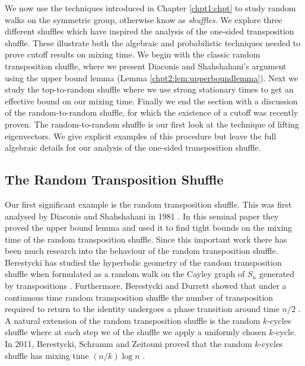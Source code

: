\documentclass[11pt]{report}
\begin{document}
We now use the techniques introduced in Chapter \ref{chpt1:chpt} to study random walks on the symmetric group, otherwise know as \emph{shuffles}. 
We explore three different shuffles which have inspired the analysis of the one-sided transposition shuffle. These illustrate both the algebraic and probabilistic techniques needed to prove cutoff results on mixing time. We begin with the classic random transposition shuffle, where we present Diaconis and Shahshahani's argument using the upper bound lemma (Lemma \ref{chpt2:lem:upperboundlemma}). 
Next we study the top-to-random shuffle where we use strong stationary times to get an effective bound on our mixing time. 
Finally we end the section with a discussion of the random-to-random shuffle, for which the existence of a cutoff was recently proven. The random-to-random shuffle is our first look at the technique of lifting eigenvectors. We give explicit examples of this procedure but leave the full algebraic details for our analysis of the one-sided transposition shuffle.

\subsection{The Random Transposition Shuffle}
\label{chpt4:subsec:rt}

Our first significant example is the random transposition shuffle. This 
was first analysed by Diaconis and Shahshahani in 1981 
\cite{diaconis1981generating}. In this seminal paper they proved the upper 
bound lemma and used it to find tight bounds on the mixing time of the 
random transposition shuffle.	Since this important work there has been much research into the behaviour of the random transposition shuffle. Berestycki has studied the hyperbolic geometry of the random transposition shuffle when formulated as a random walk on the Cayley graph of $S_{n}$ generated by transpositions \cite{berestycki2006hyperbolic}. Furthermore, Berestycki and Durrett showed that under a continuous time random transposition shuffle the number of transposition required to return to the identity undergoes a phase transition around time $n/2$ \cite{berestycki2006phase}. A natural extension of the random transposition shuffle is the random $k$-cycles shuffle where at each step we of the shuffle we apply a uniformly chosen $k$-cycle. In 2011, Berestycki, Schramm and Zeitouni proved that the random $k$-cycles shuffle has mixing time $(n/k)\log n$ \cite{Berestycki2011}.
\end{document}
